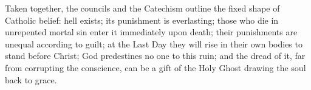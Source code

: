 Taken together, the councils and the Catechism outline the fixed shape of Catholic belief: hell exists; its punishment is everlasting; those who die in unrepented mortal sin enter it immediately upon death; their punishments are unequal according to guilt; at the Last Day they will rise in their own bodies to stand before Christ; God predestines no one to this ruin; and the dread of it, far from corrupting the conscience, can be a gift of the Holy Ghost drawing the soul back to grace.
